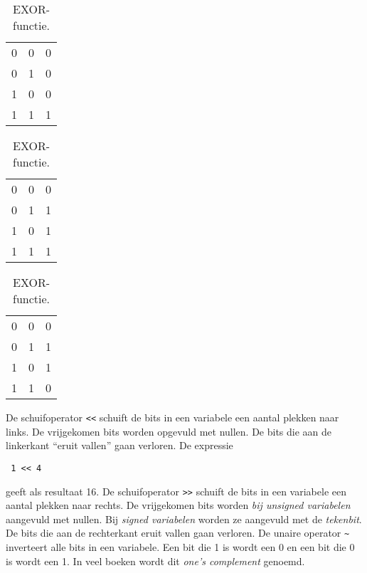 \begin{table}[!ht]
\centering
\caption{De drie bitsgewijze operatoren.}
\label{tab:driebaisfuncties}
\begin{subtable}[t]{0.333\textwidth}
\centering
\caption{AND-functie.}
\label{tab:enbasisfunctie}
\begin{tabular}{cc|c}
0 & 0 & 0  \\
0 & 1 & 0  \\
1 & 0 & 0  \\
1 & 1 & 1  \\
\end{tabular}
\end{subtable}%
\begin{subtable}[t]{0.333\textwidth}
\centering
\caption{OR-functie.}
\label{tab:ofbasisfunctie}
\begin{tabular}{cc|c}
0 & 0 & 0  \\
0 & 1 & 1  \\
1 & 0 & 1  \\
1 & 1 & 1  \\
\end{tabular}
\end{subtable}%
\begin{subtable}[t]{0.333\textwidth}
\centering
\caption{EXOR-functie.}
\label{tab:exofbasisfunctie}
\begin{tabular}{cc|c}
0 & 0 & 0  \\
0 & 1 & 1  \\
1 & 0 & 1  \\
1 & 1 & 0  \\
\end{tabular}
\end{subtable}
\end{table}

De schuifoperator \texttt{<<} schuift de bits in een variabele een aantal plekken naar links. De vrijgekomen bits worden opgevuld met nullen. De bits die aan de linkerkant ``eruit vallen'' gaan verloren. De expressie

\hspace*{1em}\texttt{ 1 << 4}

geeft als resultaat 16. De schuifoperator \texttt{>>} schuift de bits in een variabele een aantal plekken naar rechts. De vrijgekomen bits worden \textsl{bij unsigned variabelen} aangevuld met nullen. Bij  \textsl{signed variabelen} worden ze aangevuld met de \textsl{tekenbit}. De bits die aan de rechterkant eruit vallen gaan verloren. De unaire operator \texttt{\textasciitilde} inverteert alle bits in een variabele. Een bit die 1 is wordt een 0 en een bit die 0 is wordt een 1. In veel boeken wordt dit \textsl{one's complement} genoemd.

